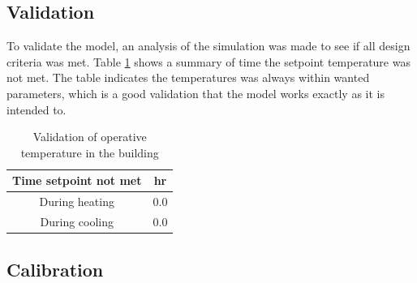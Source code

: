 \subsection{Validation}

To validate the model, an analysis of the simulation was made to see if all design criteria was met. Table \ref{tab:valid} shows a summary of time the setpoint temperature was not met. The table indicates the temperatures was always within wanted parameters, which is a good validation that the model works exactly as it is intended to.

\begin{table}[h!]
    \centering
        \caption{Validation of operative temperature in the building}
    \begin{tabular}{|c|c|}
         \hline
        Time setpoint not met & hr  \\
         \hline
         During heating & 0.0 \\
         \hline
         During cooling & 0.0 \\
         \hline
    \end{tabular}
    \label{tab:valid}
\end{table}


\subsection{Calibration}
